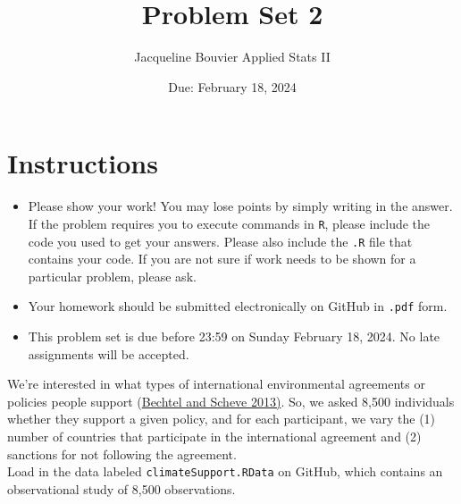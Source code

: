 \documentclass[12pt,letterpaper]{article}
\title{Problem Set 2}
\date{Due: February 18, 2024}
\author{ Jacqueline Bouvier Applied Stats II}
\begin{document}
	\maketitle
	\section*{Instructions}
	\begin{itemize}
		\item Please show your work! You may lose points by simply writing in the answer. If the problem requires you to execute commands in \texttt{R}, please include the code you used to get your answers. Please also include the \texttt{.R} file that contains your code. If you are not sure if work needs to be shown for a particular problem, please ask.
		\item Your homework should be submitted electronically on GitHub in \texttt{.pdf} form.
		\item This problem set is due before 23:59 on Sunday February 18, 2024. No late assignments will be accepted.
	\end{itemize}

	
	

	\vspace{.25cm}
\noindent We're interested in what types of international environmental agreements or policies people support (\href{https://www.pnas.org/content/110/34/13763}{Bechtel and Scheve 2013)}. So, we asked 8,500 individuals whether they support a given policy, and for each participant, we vary the (1) number of countries that participate in the international agreement and (2) sanctions for not following the agreement. \\

\noindent Load in the data labeled \texttt{climateSupport.RData} on GitHub, which contains an observational study of 8,500 observations.
\end{document}
